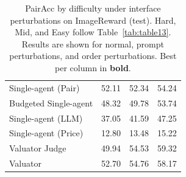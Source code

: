 \begin{table}[t]
\begin{minipage}[t]{0.32\textwidth}
\begin{tabular}{lccc}
\midrule
Single-agent (Pair)          & 52.11 & 52.34 & 54.24 \\
Budgeted Single-agent        & 48.32 & 49.78 & 53.74 \\
Single-agent (LLM)           & 37.05 & 41.59 & 47.25 \\
Single-agent (Price)         & 12.80 & 13.48 & 15.22 \\
Valuator Judge               & 49.94 & 54.53 & 59.32 \\
Valuator                     & 52.70 & 54.76 & 58.17 \\
\bottomrule
\end{tabular}
\end{minipage}

\caption{PairAcc by difficulty under interface perturbations on ImageReward (test).
Hard, Mid, and Easy follow Table~\ref{tab:table13}. Results are shown for normal, prompt perturbations, and order perturbations. Best per column in \textbf{bold}.}
\label{tab:imagereward_threepanel}
\end{table}
